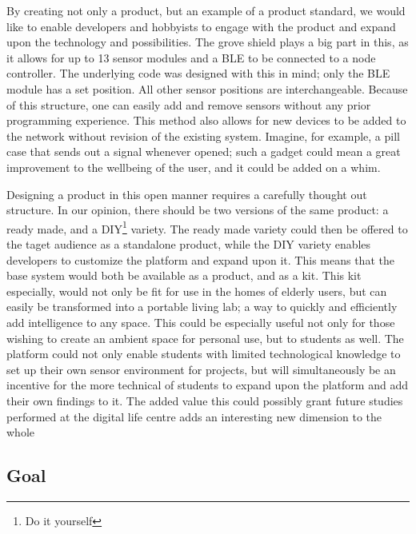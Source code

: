 \documentclass{below-ext}
\begin{document}
By creating not only a product, but an example of a product standard, we would like to enable developers and hobbyists to engage with the product and expand upon the technology and possibilities. The grove shield plays a big part in this, as it allows for up to 13 sensor modules and a BLE to be connected to a node controller. The underlying code was designed with this in mind; only the BLE module has a set position. All other sensor positions are interchangeable. Because of this structure, one can easily add and remove sensors without any prior programming experience. This method also allows for new devices to be added to the network without revision of the existing system. Imagine, for example, a pill case that sends out a signal whenever opened; such a gadget could mean a great improvement to the wellbeing of the user, and it could be added on a whim. 

Designing a product in this open manner requires a carefully thought out structure. In our opinion, there should be two versions of the same product: a ready made, and a DIY\footnote{Do it yourself} variety. The ready made variety could then be offered to the taget audience as a standalone product, while the DIY variety enables developers to customize the platform and expand upon it. This means that the base system would both be available as a product, and as a kit. This kit especially, would not only be fit for use in the homes of elderly users, but can easily be transformed into a portable living lab; a way to quickly and efficiently add intelligence to any space. This could be especially useful not only for those wishing to create an ambient space for personal use, but to students as well. The platform could not only enable students with limited technological knowledge to set up their own sensor environment for projects, but will simultaneously be an incentive for the more technical of students to expand upon the platform and add their own findings to it.  The added value this could possibly grant future studies performed at the digital life centre adds an interesting new dimension to the whole


\subsection{Goal}
\end{document}
